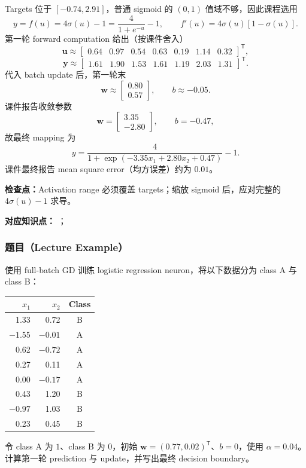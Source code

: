 \begin{checkedsolution}
Targets 位于 $[-0.74,2.91]$，普通 sigmoid 的 $(0,1)$ 值域不够，因此课程选用
\[
  y=f(u)=4\sigma(u)-1=\frac{4}{1+e^{-u}}-1,
  \qquad f'(u)=4\sigma(u)[1-\sigma(u)].
\]
第一轮 forward computation 给出（按课件舍入）
\[
  \bm u\approx
  \begin{bmatrix}0.64&0.97&0.54&0.63&0.19&1.14&0.32\end{bmatrix}^{\mathsf T},
\]
\[
  \bm y\approx
  \begin{bmatrix}1.61&1.90&1.53&1.61&1.19&2.03&1.31\end{bmatrix}^{\mathsf T}.
\]
代入 batch update 后，第一轮末
\[
  \bm w\approx
  \begin{bmatrix}0.80\\0.57\end{bmatrix},
  \qquad b\approx-0.05.
\]
课件报告收敛参数
\[
  \bm w=
  \begin{bmatrix}3.35\\-2.80\end{bmatrix},
  \qquad b=-0.47,
\]
故最终 mapping 为
\[
  \boxed{y=\frac{4}{1+\exp(-3.35x_1+2.80x_2+0.47)}-1}.
\]
课件最终报告 mean square error（均方误差）约为 $0.01$。
\end{checkedsolution}

\textbf{检查点：}Activation range 必须覆盖 targets；缩放 sigmoid 后，应对完整的 $4\sigma(u)-1$ 求导。


\textbf{对应知识点：}
；

\subsubsection*{题目（Lecture Example）}

使用 full-batch GD 训练 logistic regression neuron，将以下数据分为 class A 与 class B：
\begin{center}
\small
\begin{tabular}{@{}rrc@{}}
  \toprule
  $x_1$ & $x_2$ & Class \\
  \midrule
   1.33 &  0.72 & B \\
  $-1.55$ & $-0.01$ & A \\
   0.62 & $-0.72$ & A \\
   0.27 &  0.11 & A \\
   0.00 & $-0.17$ & A \\
   0.43 &  1.20 & B \\
  $-0.97$ &  1.03 & B \\
   0.23 &  0.45 & B \\
  \bottomrule
\end{tabular}
\end{center}
令 class A 为 $1$、class B 为 $0$，初始 $\bm w=(0.77,0.02)^{\mathsf T}$、$b=0$，使用 $\alpha=0.04$。计算第一轮 prediction 与 update，并写出最终 decision boundary。

